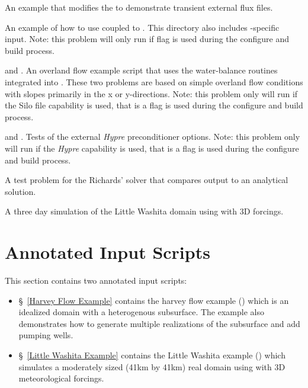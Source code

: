 \begin{description}
\item{ An example that modifies the  to demonstrate transient external flux  files.}

\item{ An example of how to use \parflow{} coupled to {}.  This directory also includes {}-specific input. Note: this problem will only run if {} flag is used during the configure and build process.}

\item{ and {}. An overland flow example script that uses the water-balance routines integrated into {}.  These two problems are based on simple overland flow conditions with slopes primarily in the x or y-directions.  Note: this problem only will run if the Silo file capability is used, that is a {} flag is used during the configure and build process.}

\item{ and . Tests of the external \emph{Hypre} preconditioner options.  Note: this problem only will run if the \emph{Hypre} capability is used, that is a {} flag is used during the configure and build process.}

\item{ A test problem for the Richards' solver that compares output to an analytical solution.}

\item{ A three day simulation of the Little Washita domain using \parflow{}  with 3D forcings. }

\end{description}


\section{Annotated Input Scripts}
\label{Tutorial}

This section contains two annotated input scripts:

\begin{itemize}
	\item \S~\ref{Harvey Flow Example} contains the harvey flow example ()
	which is an idealized domain with a heterogenous subsurface. The example also demonstrates how to generate 
	multiple realizations of the subsurface and add pumping wells. 
	 
	\item \S~\ref{Little Washita Example} contains the Little Washita example ()
	which simulates a moderately sized (41km by 41km) real domain using \parflow{} 
	with 3D meteorological forcings.
	 
\end{itemize}

